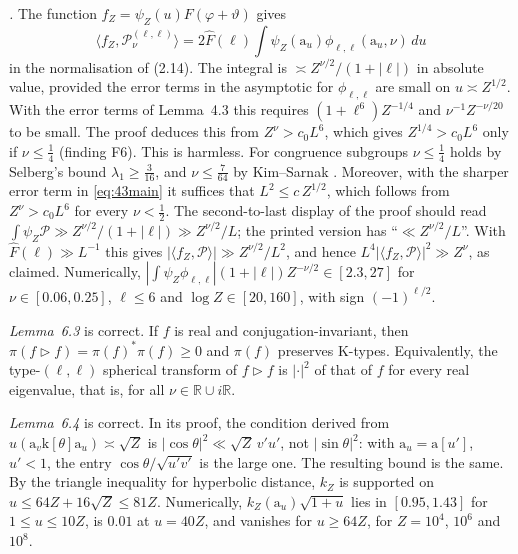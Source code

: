 \documentclass[11pt]{amsart}
\theoremstyle{remark}
\theoremstyle{definition}
\numberwithin{equation}{section}
\newcommand{\R}{\mathbb{R}}
\newcommand{\K}{\mathrm{K}}
\newcommand{\br}[1]{\langle #1\rangle}
\newcommand{\Pc}{\mathcal{P}}
\newcommand{\ra}{\mathrm{a}}
\newcommand{\rk}{\mathrm{k}}
\begin{document}
\emph{\cite[Proposition~6.2]{GM1}.} The function $f_Z=\psi_Z(u)F(\varphi+\vartheta)$ gives
\[
\br{f_Z,\Pc^{(\ell,\ell)}_\nu}=2\hat F(\ell)\int\psi_Z(\ra_u)\phi_{\ell,\ell}(\ra_u,\nu)\,du
\]
in the normalisation of (2.14). The integral is $\asymp Z^{\nu/2}/(1+|\ell|)$ in absolute value, provided the error terms in the asymptotic for $\phi_{\ell,\ell}$ are small on $u\asymp Z^{1/2}$. With the error terms of Lemma~4.3 this requires $(1+\ell^6)Z^{-1/4}$ and $\nu^{-1}Z^{-\nu/20}$ to be small. The proof deduces this from $Z^\nu>c_0L^6$, which gives $Z^{1/4}>c_0L^6$ only if $\nu\le\frac14$ (finding F6). This is harmless. For congruence subgroups $\nu\le\frac14$ holds by Selberg's bound $\lambda_1\ge\frac3{16}$, and $\nu\le\frac7{64}$ by Kim--Sarnak \cite{Kim}. Moreover, with the sharper error term in \eqref{eq:43main} it suffices that $L^2\le c\,Z^{1/2}$, which follows from $Z^\nu>c_0L^6$ for every $\nu<\frac12$. The second-to-last display of the proof should read $\int\psi_Z\Pc\gg Z^{\nu/2}/(1+|\ell|)\gg Z^{\nu/2}/L$; the printed version has ``$\ll Z^{\nu/2}/L$''. With $\hat F(\ell)\gg L^{-1}$ this gives $|\br{f_Z,\Pc}|\gg Z^{\nu/2}/L^2$, and hence $L^4|\br{f_Z,\Pc}|^2\gg Z^\nu$, as claimed. Numerically, $|\int\psi_Z\phi_{\ell,\ell}|(1+|\ell|)Z^{-\nu/2}\in[2.3,27]$ for $\nu\in[0.06,0.25]$, $\ell\le6$ and $\log Z\in[20,160]$, with sign $(-1)^{\ell/2}$.

\emph{Lemma~6.3} is correct. If $f$ is real and conjugation-invariant, then $\pi(f\triangleright f)=\pi(f)^*\pi(f)\ge0$ and $\pi(f)$ preserves $\K$-types. Equivalently, the type-$(\ell,\ell)$ spherical transform of $f\triangleright f$ is $|\cdot|^2$ of that of $f$ for every real eigenvalue, that is, for all $\nu\in\R\cup i\R$.

\emph{Lemma~6.4} is correct. In its proof, the condition derived from $u(\ra_v\rk[\theta]\ra_u)\asymp\sqrt Z$ is $|\cos\theta|^2\ll\sqrt Z\,v'u'$, not $|\sin\theta|^2$: with $\ra_u=\ra[u']$, $u'<1$, the entry $\cos\theta/\sqrt{u'v'}$ is the large one. The resulting bound is the same. By the triangle inequality for hyperbolic distance, $k_Z$ is supported on $u\le64Z+16\sqrt Z\le81Z$. Numerically, $k_Z(\ra_u)\sqrt{1+u}$ lies in $[0.95,1.43]$ for $1\le u\le10Z$, is $0.01$ at $u=40Z$, and vanishes for $u\ge64Z$, for $Z=10^4$, $10^6$ and $10^8$.
\end{document}
